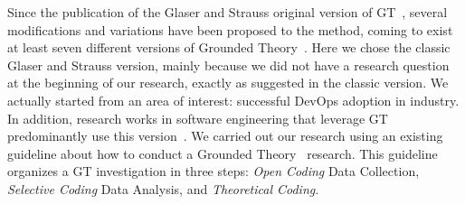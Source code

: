 Since the publication of the Glaser and Strauss original version of GT~\cite{glase1967discovery},
several modifications and variations have been proposed to the method, coming to
exist at least seven different versions of Grounded Theory~\cite{denzin2007grounded}.
Here we chose the classic
Glaser and Strauss version, mainly because we did not have a research
question at the beginning of our research, exactly as suggested in the classic
version. We actually started from an area of interest: successful DevOps adoption
in industry. In addition, research works in software engineering that leverage GT
predominantly use this version~\cite{stol2016grounded}.
We carried out our research using an existing
guideline about how to conduct a
Grounded Theory~\cite{adolph2011using} research. This guideline organizes
a GT investigation in three steps: \emph{Open Coding} Data Collection,
\emph{Selective Coding} Data Analysis, and \emph{Theoretical Coding}.







